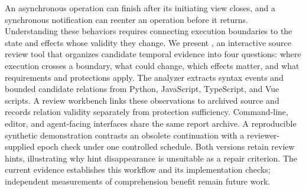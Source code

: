 An asynchronous operation can finish after its initiating view closes, and a synchronous notification can reenter an operation before it returns. Understanding these behaviors requires connecting execution boundaries to the state and effects whose validity they change. We present \tool{}, an interactive source review tool that organizes candidate temporal evidence into four questions: where execution crosses a boundary, what could change, which effects matter, and what requirements and protections apply. The analyzer extracts syntax events and bounded candidate relations from Python, JavaScript, TypeScript, and Vue scripts. A review workbench links these observations to archived source and records relation validity separately from protection sufficiency. Command-line, editor, and agent-facing interfaces share the same report archive. A reproducible synthetic demonstration contrasts an obsolete continuation with a reviewer-supplied epoch check under one controlled schedule. Both versions retain review hints, illustrating why hint disappearance is unsuitable as a repair criterion. The current evidence establishes this workflow and its implementation checks; independent measurements of comprehension benefit remain future work.
